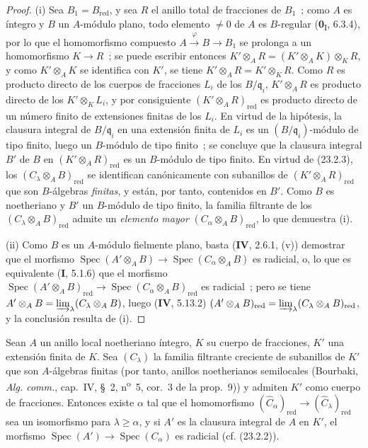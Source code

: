 \begin{proof}
(i) Sea $B_1=B_{\mathrm{red}}$, y sea $R$ el anillo total de
fracciones de $B_1$~; como $A$ es íntegro y $B$ un $A$-módulo plano, todo
elemento $\neq0$ de $A$ es $B$-regular (\textbf{0}\textsubscript{I}, 6.3.4), por lo que
el homomorfismo compuesto $A\xrightarrow{\varphi}B\to B_1$ se prolonga a un
homomorfismo $K\to R$~; se puede escribir entonces
$K'\otimes_AR=(K'\otimes_AK)\otimes_KR$, y como $K'\otimes_AK$
se identifica con $K'$, se tiene $K'\otimes_AR=K'\otimes_KR$. Como $R$ es producto
directo de los cuerpos de fracciones $L_i$ de los $B/\mathfrak q_i$,
$K'\otimes_AR$ es producto directo de los $K'\otimes_KL_i$, y por consiguiente
$(K'\otimes_AR)_{\mathrm{red}}$ es producto directo de un número finito
de extensiones finitas de los $L_i$. En virtud de la hipótesis, la clausura
integral de $B/\mathfrak q_i$ en una extensión finita de $L_i$ es un
$(B/\mathfrak q_i)$-módulo de tipo finito, luego un $B$-módulo de tipo finito~;
se concluye que la clausura integral $B'$ de $B$ en
$(K'\otimes_AR)_{\mathrm{red}}$ es un $B$-módulo de tipo finito. En virtud de
(23.2.3), los $(C_\lambda\otimes_AB)_{\mathrm{red}}$ se identifican
canónicamente con subanillos de $(K'\otimes_AR)_{\mathrm{red}}$ que son
$B$-álgebras \emph{finitas}, y están, por tanto, contenidos en $B'$. Como $B$ es noetheriano
y $B'$ un $B$-módulo de tipo finito, la familia filtrante de los
$(C_\lambda\otimes_AB)_{\mathrm{red}}$ admite un \emph{elemento mayor}
$(C_\alpha\otimes_AB)_{\mathrm{red}}$, lo que demuestra (i).

(ii) Como $B$ es un $A$-módulo fielmente plano, basta
(\textbf{IV}, 2.6.1, (v)) demostrar que el morfismo
$\operatorname{Spec}(A'\otimes_AB)\to
\operatorname{Spec}(C_\alpha\otimes_AB)$ es radicial, o, lo que es equivalente
(\textbf I, 5.1.6) que el morfismo
$\operatorname{Spec}(A'\otimes_AB)_{\mathrm{red}}\to
\operatorname{Spec}(C_\alpha\otimes_AB)_{\mathrm{red}}$ es radicial~; pero
se tiene $A'\otimes_AB=\varinjlim_\lambda(C_\lambda\otimes_AB)$, luego
(\textbf{IV}, 5.13.2)
$(A'\otimes_AB)_{\mathrm{red}}=
\varinjlim_\lambda(C_\lambda\otimes_AB)_{\mathrm{red}}$, y la conclusión
resulta de (i).
\end{proof}

\begin{corollary}[23.2.5]
\label{0.23.2.5-fr}
Sean $A$ un anillo local noetheriano íntegro, $K$ su cuerpo de fracciones,
$K'$ una extensión finita de $K$. Sea $(C_\lambda)$ la familia filtrante
creciente de subanillos de $K'$ que son $A$-álgebras finitas \textup{(por tanto,
anillos noetherianos semilocales (Bourbaki, \emph{Alg. comm.}, cap.~IV,
§~2, n\textsuperscript{o}~5, cor.~3 de la prop.~9))} y admiten $K'$ como
cuerpo de fracciones. Entonces existe $\alpha$ tal que el homomorfismo
$(\widehat C_\alpha)_{\mathrm{red}}\to
(\widehat C_\lambda)_{\mathrm{red}}$ sea un isomorfismo para
$\lambda\geqslant\alpha$, y si $A'$ es la clausura integral de $A$ en
$K'$, el morfismo
$\operatorname{Spec}(A')\to\operatorname{Spec}(C_\alpha)$ es radicial
\textup{(cf. (23.2.2))}.
\end{corollary}


